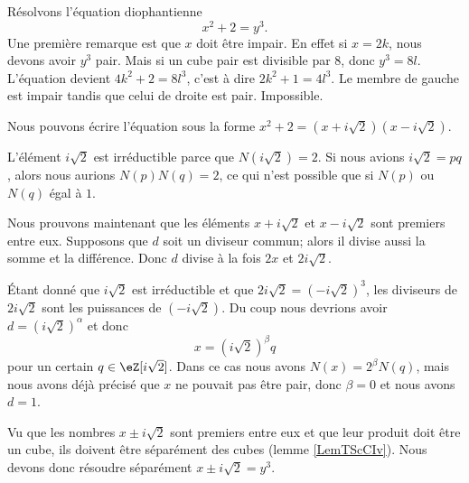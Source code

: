 \begin{example}     \label{ExmuQisZU}
    Résolvons l'équation diophantienne 
    \begin{equation}
        x^2+2=y^3.
    \end{equation}
    Une première remarque est que \( x\) doit être impair. En effet si \( x=2k\), nous devons avoir \( y^3\) pair. Mais si un cube pair est divisible par \( 8\), donc \( y^3=8l\). L'équation devient \( 4k^2+2=8l^3\), c'est à dire \( 2k^2+1=4l^3\). Le membre de gauche est impair tandis que celui de droite est pair. Impossible.

    Nous pouvons écrire l'équation sous la forme \( x^2+2=(x+i\sqrt{2})(x-i\sqrt{2})\).

    L'élément \( i\sqrt{2}\) est irréductible parce que \( N(i\sqrt{2})=2\). Si nous avions \( i\sqrt{2}=pq\), alors nous aurions \( N(p)N(q)=2\), ce qui n'est possible que si \( N(p)\) ou \( N(q)\) égal à \( 1\).

    Nous prouvons maintenant que les éléments \( x+i\sqrt{2}\) et \( x-i\sqrt{2}\) sont premiers entre eux. Supposons que \( d\) soit un diviseur commun; alors il divise aussi la somme et la différence. Donc \( d\) divise à la fois \( 2x\) et \( 2i\sqrt{2}\).

    Étant donné que \( i\sqrt{2}\) est irréductible et que \( 2i\sqrt{2}=(-i\sqrt{2})^3\), les diviseurs de \( 2i\sqrt{2}\) sont les puissances de \( (-i\sqrt{2})\). Du coup nous devrions avoir \( d=(i\sqrt{2})^{\alpha}\) et donc
    \begin{equation}
        x=(i\sqrt{2})^{\beta}q
    \end{equation}
    pour un certain \( q\in\eZ[i\sqrt{2}]\). Dans ce cas nous avons \( N(x)=2^{\beta}N(q)\), mais nous avons déjà précisé que \( x\) ne pouvait pas être pair, donc \( \beta=0\) et nous avons \( d=1\).

    Vu que les nombres \( x\pm i\sqrt{2}\) sont premiers entre eux et que leur produit doit être un cube, ils doivent être séparément des cubes (lemme \ref{LemTScCIv}). Nous devons donc résoudre séparément \( x\pm i\sqrt{2}=y^3\).


\end{example}
